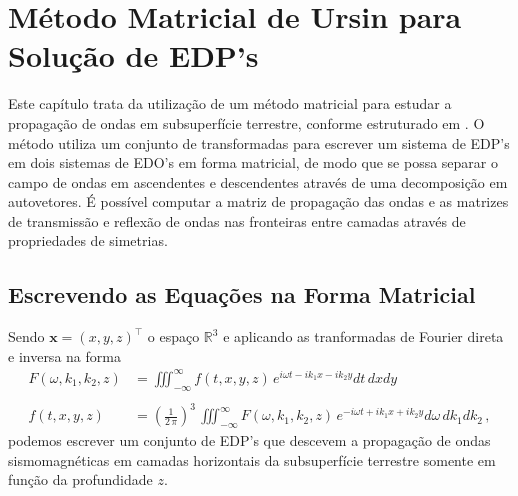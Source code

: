 \chapter{M\'etodo Matricial de Ursin para Solu\c{c}\~ao de EDP's}
Este cap\'itulo trata da utiliza\c{c}\~ao de um m\'etodo matricial para estudar a propaga\c{c}\~ao de ondas em subsuperf\'icie terrestre, conforme estruturado em \cite{Ursin-1983}. O m\'etodo utiliza um conjunto de transformadas para escrever um sistema de EDP's em dois sistemas de EDO's em forma matricial, de modo que se possa separar o campo de ondas em ascendentes e descendentes atrav\'es de uma decomposi\c{c}\~ao em autovetores. \'E poss\'ivel computar a matriz de propaga\c{c}\~ao das ondas e as matrizes de transmiss\~ao e reflex\~ao de ondas nas fronteiras entre camadas atrav\'es de propriedades de simetrias.

\section{Escrevendo as Equa\c{c}\~oes na Forma Matricial}

Sendo $\mathbf{x}=(x,y,z)^{\top}$ o espa\c{c}o $\mathbb{R}^3$ e aplicando as tranformadas de Fourier direta e inversa na forma
\begin{align*}
F(\omega,k_1,k_2,z) &= \iiint_{-\infty}^{\infty}f(t,x,y,z)\,e^{i\omega t-ik_1x-ik_2y}dt\,dxdy\\\\
f(t,x,y,z) &= \left(\frac{1}{2\,\pi}\right)^3\,\iiint_{-\infty}^{\infty}F(\omega,k_1,k_2,z)\,e^{-i\omega t+ik_1x+ik_2y}d\omega\,dk_1dk_2\,,
\end{align*}
podemos escrever um conjunto de EDP's que descevem a propaga\c{c}\~ao de ondas sismomagn\'eticas em camadas horizontais da subsuperf\'icie terrestre somente em fun\c{c}\~ao da profundidade $z$. 

